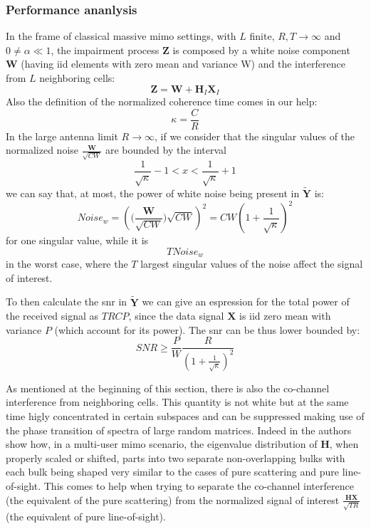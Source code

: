 \documentclass[11pt]{book}
\begin{document}
\subsubsection{Performance ananlysis}
In the frame of classical massive \gls{mimo} settings, with $L$ finite, $R,T \rightarrow \infty$ and $0 \neq \alpha \ll 1$, the impairment process $\mathbf{Z}$ is composed by a white noise component $\mathbf{W}$ (having iid elements with zero mean and variance W) and the interference from $L$ neighboring cells:
\begin{equation}
  \mathbf{Z} = \mathbf{W} + \mathbf{H}_I\mathbf{X}_I
\end{equation}
Also the definition of the normalized coherence time comes in our help:
\begin{equation}
  \kappa = \frac{C}{R}
\end{equation}
In the large antenna limit $R \rightarrow \infty$, if we consider that the singular values of the normalized noise $\frac{\mathbf{W}}{\sqrt{CW}}$ are bounded by the interval
\begin{equation}
  \frac{1}{\sqrt{\kappa}} - 1 < x < \frac{1}{\sqrt{\kappa}} + 1
\end{equation}
we can say that, at most, the power of white noise being present in $\mathbf{\tilde{Y}}$ is:
\begin{equation}
  Noise_w = \left(\Big(\frac{\mathbf{W}}{\sqrt{CW}}\Big)\sqrt{CW}\right)^2 = CW\left(1+\frac{1}{\sqrt{\kappa}}\right)^2
\end{equation}
for one singular value, while it is
\begin{equation}
  TNoise_w
\end{equation}
in the worst case, where the $T$ largest singular values of the noise affect the signal of interest.

To then calculate the \gls{snr} in $\mathbf{\tilde{Y}}$ we can give an espression for the total power of the received signal as $TRCP$, since the data signal $\mathbf{X}$ is iid zero mean with variance $P$ (which account for its power). The \gls{snr} can be thus lower bounded by:
\begin{equation}
  SNR \geq \frac{P}{W}\frac{R}{\left(1+ \frac{1}{\sqrt{\kappa}}\right)^2}
\end{equation}


As mentioned at the beginning of this section, there is also the co-channel interference from neighboring cells. This quantity is not white but at the same time higly concentrated in certain subspaces and can be suppressed making use of the phase transition of spectra of large random matrices. Indeed in \cite{Ralf2012} the authors show how, in a multi-user \gls{mimo} scenario, the eigenvalue distribution of $\mathbf{H}$, when properly scaled or shifted, parts into two separate non-overlapping bulks with each bulk being shaped very similar to the cases of pure scattering and pure line-of-sight. This comes to help when trying to separate the co-channel interference (the equivalent of the pure scattering) from the normalized signal of interest $\frac{\mathbf{HX}}{\sqrt{TR}}$ (the equivalent of pure line-of-sight).
\end{document}
